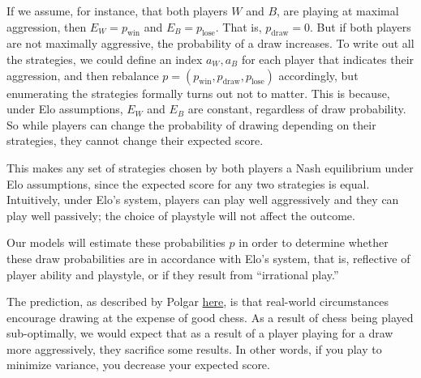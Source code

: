 \documentclass{article}
\begin{document}
If we assume, for instance, that both players $W$ and $B$, are playing at maximal aggression, then $E_W=p_{\text{win}}$ and $E_B=p_{\text{lose}}$. That is, $p_{\text{draw}}=0$.
But if both players are not maximally aggressive, the probability of a draw increases.
To write out all the strategies, we could define an index $a_W, a_B$ for each player that indicates their aggression,
and then rebalance
$p=(p_{\text{win}}, p_{\text{draw}}, p_{\text{lose}})$ accordingly, but enumerating the strategies formally turns out not to matter.
This is because, under Elo assumptions, $E_W$ and $E_B$ are constant, regardless of draw probability.
So while players can change the probability of drawing depending on their strategies, they
cannot change their expected score.
%

This makes any set of strategies chosen by both players a Nash equilibrium under Elo assumptions, since
the expected score for any two strategies is equal.
Intuitively, under Elo's system, players can play well
aggressively and they can play well passively; the choice of playstyle will not affect the outcome.

Our models will estimate these probabilities $p$ in order to determine whether these draw probabilities are in accordance with Elo's system, that is, reflective of player ability and playstyle,
or if they result from ``irrational play.''

The prediction, as described by Polgar \href{https://chessdailynews.com/the-700-lbs-gorilla-issue-to-draw-or-not-to-draw/}{here}, is that real-world circumstances encourage drawing at the expense of good chess.
As a result of chess being played sub-optimally, we would expect that as a result of a player playing for a draw more aggressively,
they sacrifice some results. In other words, if you play to minimize variance, you decrease your expected score.
\end{document}
